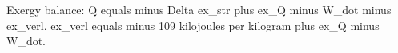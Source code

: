 Exergy balance:  
Q equals minus Delta ex_str plus ex_Q minus W_dot minus ex_verl.  
ex_verl equals minus 109 kilojoules per kilogram plus ex_Q minus W_dot.